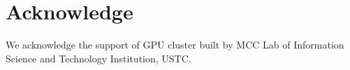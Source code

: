 \documentclass[journal]{IEEEtran}
\begin{document}
\section*{Acknowledge} \label{sec:acknowledge}
We acknowledge the support of GPU cluster built by MCC Lab of Information Science and Technology Institution, USTC.


















\ifCLASSOPTIONcaptionsoff
\newpage
\fi











\end{document}
